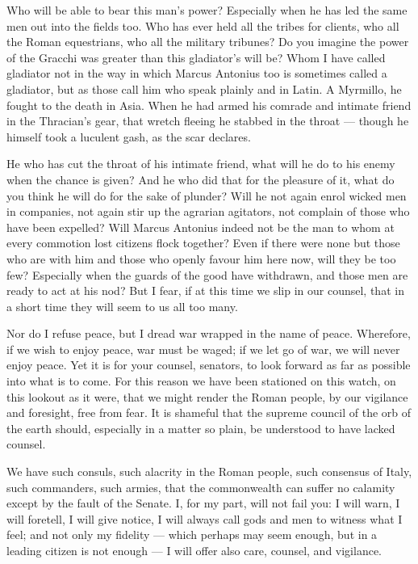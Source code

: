  Who will be able to bear this man's power? Especially when he has led the same men out into the fields too. Who has ever held all the tribes for clients, who all the Roman equestrians, who all the military tribunes? Do you imagine the power of the Gracchi was greater than this gladiator's will be? Whom I have called gladiator not in the way in which Marcus Antonius too is sometimes called a gladiator, but as those call him who speak plainly and in Latin. A Myrmillo, he fought to the death in Asia. When he had armed his comrade and intimate friend in the Thracian's gear, that wretch fleeing he stabbed in the throat --- though he himself took a luculent gash, as the scar declares.

 He who has cut the throat of his intimate friend, what will he do to his enemy when the chance is given? And he who did that for the pleasure of it, what do you think he will do for the sake of plunder? Will he not again enrol wicked men in companies, not again stir up the agrarian agitators, not complain of those who have been expelled? Will Marcus Antonius indeed not be the man to whom at every commotion lost citizens flock together? Even if there were none but those who are with him and those who openly favour him here now, will they be too few? Especially when the guards of the good have withdrawn, and those men are ready to act at his nod? But I fear, if at this time we slip in our counsel, that in a short time they will seem to us all too many.

 Nor do I refuse peace, but I dread war wrapped in the name of peace. Wherefore, if we wish to enjoy peace, war must be waged; if we let go of war, we will never enjoy peace. Yet it is for your counsel, senators, to look forward as far as possible into what is to come. For this reason we have been stationed on this watch, on this lookout as it were, that we might render the Roman people, by our vigilance and foresight, free from fear. It is shameful that the supreme council of the orb of the earth should, especially in a matter so plain, be understood to have lacked counsel.

 We have such consuls, such alacrity in the Roman people, such consensus of Italy, such commanders, such armies, that the commonwealth can suffer no calamity except by the fault of the Senate. I, for my part, will not fail you: I will warn, I will foretell, I will give notice, I will always call gods and men to witness what I feel; and not only my fidelity --- which perhaps may seem enough, but in a leading citizen is not enough --- I will offer also care, counsel, and vigilance.

